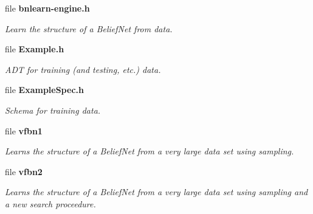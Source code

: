 \begin{CompactItemize}
\item 
file {\bf bnlearn-engine.h}
\begin{CompactList}\small\item\em Learn the structure of a Belief\-Net from data. \item\end{CompactList}

\item 
file {\bf Example.h}
\begin{CompactList}\small\item\em ADT for training (and testing, etc.) data. \item\end{CompactList}

\item 
file {\bf Example\-Spec.h}
\begin{CompactList}\small\item\em Schema for training data. \item\end{CompactList}

\item 
file {\bf vfbn1}
\begin{CompactList}\small\item\em Learns the structure of a Belief\-Net from a very large data set using sampling. \item\end{CompactList}

\item 
file {\bf vfbn2}
\begin{CompactList}\small\item\em Learns the structure of a Belief\-Net from a very large data set using sampling and a new search proceedure. \item\end{CompactList}

\end{CompactItemize}
